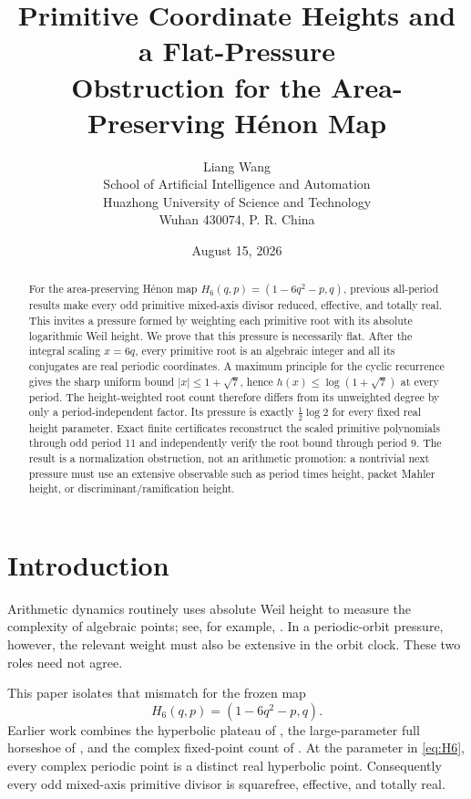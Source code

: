 \documentclass[11pt]{article}
\title{Primitive Coordinate Heights and a Flat-Pressure\\
Obstruction for the Area-Preserving H\'enon Map}
\author{Liang Wang\\
\small School of Artificial Intelligence and Automation\\[-1mm]
\small Huazhong University of Science and Technology\\[-1mm]
\small Wuhan 430074, P. R. China}
\date{August 15, 2026}
\theoremstyle{remark}
\begin{document}
\maketitle

\begin{abstract}
For the area-preserving H\'enon map
$H_6(q,p)=(1-6q^2-p,q)$, previous all-period results make every odd
primitive mixed-axis divisor reduced, effective, and totally real.  This
invites a pressure formed by weighting each primitive root with its absolute
logarithmic Weil height.  We prove that this pressure is necessarily flat.
After the integral scaling $x=6q$, every primitive root is an algebraic
integer and all its conjugates are real periodic coordinates.  A maximum
principle for the cyclic recurrence gives the sharp uniform bound
$|x|\le1+\sqrt7$, hence $h(x)\le\log(1+\sqrt7)$ at every period.  The
height-weighted root count therefore differs from its unweighted degree by
only a period-independent factor.  Its pressure is exactly
$\frac12\log2$ for every fixed real height parameter.  Exact finite
certificates reconstruct the scaled primitive polynomials through odd period
11 and independently verify the root bound through period 9.  The result is
a normalization obstruction, not an arithmetic promotion: a nontrivial next
pressure must use an extensive observable such as period times height,
packet Mahler height, or discriminant/ramification height.
\end{abstract}

\section{Introduction}
Arithmetic dynamics routinely uses absolute Weil height to measure the
complexity of algebraic points; see, for example, \citet{Silverman2007}.
In a periodic-orbit pressure, however, the relevant weight must also be
extensive in the orbit clock.  These two roles need not agree.

This paper isolates that mismatch for the frozen map
\begin{equation}\label{eq:H6}
H_6(q,p)=(1-6q^2-p,q).
\end{equation}
Earlier work combines the hyperbolic plateau of \citet{Arai2007}, the
large-parameter full horseshoe of \citet{DevaneyNitecki1979}, and the complex
fixed-point count of \citet{FriedlandMilnor1989}.  At the parameter in
\eqref{eq:H6}, every complex periodic point is a distinct real hyperbolic
point.  Consequently every odd mixed-axis primitive divisor is squarefree,
effective, and totally real.
\end{document}
